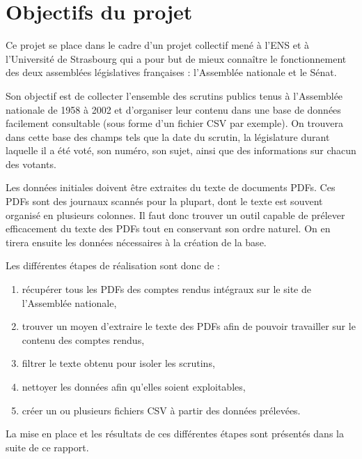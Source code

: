 \section{Objectifs du projet}

Ce projet se place dans le cadre d'un projet collectif mené à l'ENS et à l'Université de Strasbourg qui a pour but de mieux connaître le fonctionnement des deux assemblées législatives françaises : l'Assemblée nationale et le Sénat.

Son objectif est de collecter l'ensemble des scrutins publics tenus à l'Assemblée nationale de 1958 à 2002 et d'organiser leur contenu dans une base de données facilement consultable (sous forme d'un fichier CSV par exemple). On trouvera dans cette base des champs tels que la date du scrutin, la législature durant laquelle il a été voté, son numéro, son sujet, ainsi que des informations sur chacun des votants.

Les données initiales doivent être extraites du texte de documents PDFs. Ces PDFs sont des journaux scannés pour la plupart, dont le texte est souvent organisé en plusieurs colonnes. Il faut donc trouver un outil capable de prélever efficacement du texte des PDFs tout en conservant son ordre naturel. On en tirera ensuite les données nécessaires à la création de la base.

Les différentes étapes de réalisation sont donc de :
\begin{enumerate}
\item récupérer tous les PDFs des comptes rendus intégraux sur le site de l'Assemblée nationale,
\item trouver un moyen d'extraire le texte des PDFs afin de pouvoir travailler sur le contenu des comptes rendus,
\item filtrer le texte obtenu pour isoler les scrutins,
\item nettoyer les données afin qu'elles soient exploitables,
\item créer un ou plusieurs fichiers CSV à partir des données prélevées.
\end{enumerate}

\vspace{0.3cm}
La mise en place et les résultats de ces différentes étapes sont présentés dans la suite de ce rapport.
